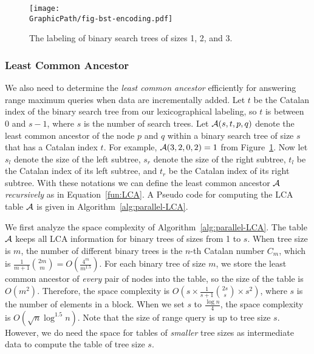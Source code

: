 \begin{figure}[!thb]
  \centering
  \texttt{[image: \\GraphicPath/fig-bst-encoding.pdf]}
  \caption{The labeling of binary search trees of sizes 1, 2, and 3.}
  \label{fig:labelingBST}
\end{figure}

\subsubsection{Least Common Ancestor}

We also need to determine the {\em least common ancestor} efficiently
for answering range maximum queries when data are incrementally added.
Let $t$ be the Catalan index of the binary search tree from our
lexicographical labeling, so $t$ is between 0 and $s - 1$, where $s$
is the number of search trees.  Let ${\cal A}(s, t, p, q)$ denote the
least common ancestor of the node $p$ and $q$ within a binary search
tree of size $s$ that has a Catalan index $t$.  For example, ${\cal
  A}(3, 2, 0, 2) = 1$ from Figure~\ref{fig:labelingBST}.  Now let
$s_l$ denote the size of the left subtree, $s_r$ denote the size of
the right subtree, $t_l$ be the Catalan index of its left subtree, and
$t_r$ be the Catalan index of its right subtree.  With these notations
we can define the least common ancestor $\cal A$ {\em recursively} as
in Equation~\ref{fun:LCA}.  A Pseudo code for computing the LCA table
$\cal A$ is given in Algorithm~\ref{alg:parallel-LCA}.





We first analyze the space complexity of
Algorithm~\ref{alg:parallel-LCA}.  The table $\cal A$ keeps all LCA
information for binary trees of sizes from 1 to $s$.  When tree size
is $m$, the number of different binary trees is the $n$-th Catalan
number $C_m$, which is $\frac{1}{m+1}\binom{2m}{m} =
O(\frac{4^m}{m^{1.5}})$.  For each binary tree of size $m$, we store
the least common ancestor of {\em every} pair of nodes into the table,
so the size of the table is $O(m^2)$.  Therefore, the space complexity
is $O(s \times \frac{1}{s+1}\binom{2s}{s} \times s^2)$, where $s$ is
the number of elements in a block.  When we set $s$ to $\frac{\log
  n}{4}$, the space complexity is $O(\sqrt{n} \log ^{1.5} n)$.  Note
that the size of range query is up to tree size $s$.  However, we do
need the space for tables of {\em smaller} tree sizes as intermediate
data to compute the table of tree size $s$.

